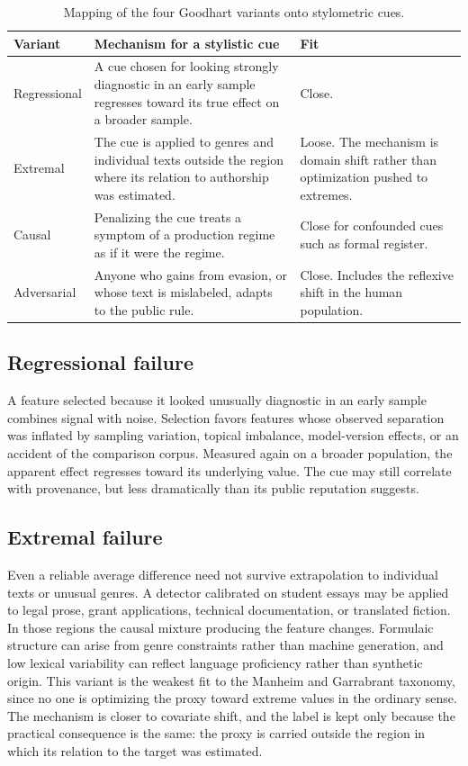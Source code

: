 \documentclass[11pt]{article}
\theoremstyle{plain}
\theoremstyle{definition}
\theoremstyle{remark}
\begin{document}
\begin{table}[ht]
\centering
\small
\renewcommand{\arraystretch}{1.25}
\begin{tabular}{@{}>{\raggedright\arraybackslash}p{}>{\raggedright\arraybackslash}p{}>{\raggedright\arraybackslash}p{}@{}}
\toprule
Variant & Mechanism for a stylistic cue & Fit \\
\midrule
Regressional & A cue chosen for looking strongly diagnostic in an early sample regresses toward its true effect on a broader sample. & Close. \\
Extremal & The cue is applied to genres and individual texts outside the region where its relation to authorship was estimated. & Loose. The mechanism is domain shift rather than optimization pushed to extremes. \\
Causal & Penalizing the cue treats a symptom of a production regime as if it were the regime. & Close for confounded cues such as formal register. \\
Adversarial & Anyone who gains from evasion, or whose text is mislabeled, adapts to the public rule. & Close. Includes the reflexive shift in the human population. \\
\bottomrule
\end{tabular}
\caption{Mapping of the four Goodhart variants onto stylometric cues.}
\label{tab:goodhart}
\end{table}

\subsection{Regressional failure}

A feature selected because it looked unusually diagnostic in an early sample combines signal with noise. Selection favors features whose observed separation was inflated by sampling variation, topical imbalance, model-version effects, or an accident of the comparison corpus. Measured again on a broader population, the apparent effect regresses toward its underlying value. The cue may still correlate with provenance, but less dramatically than its public reputation suggests.

\subsection{Extremal failure}

Even a reliable average difference need not survive extrapolation to individual texts or unusual genres. A detector calibrated on student essays may be applied to legal prose, grant applications, technical documentation, or translated fiction. In those regions the causal mixture producing the feature changes. Formulaic structure can arise from genre constraints rather than machine generation, and low lexical variability can reflect language proficiency rather than synthetic origin. This variant is the weakest fit to the Manheim and Garrabrant taxonomy, since no one is optimizing the proxy toward extreme values in the ordinary sense. The mechanism is closer to covariate shift, and the label is kept only because the practical consequence is the same: the proxy is carried outside the region in which its relation to the target was estimated.
\end{document}
